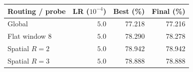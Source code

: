 \begin{tabular}{lrrr}
\toprule
Routing / probe & LR ($10^{-4}$) & Best (\%) & Final (\%) \\
\midrule
Global & $5.0$ & 77.218 & 77.216 \\
Flat window 8 & $5.0$ & 78.290 & 78.278 \\
Spatial $R=2$ & $5.0$ & 78.942 & 78.942 \\
Spatial $R=3$ & $5.0$ & 78.888 & 78.888 \\
\bottomrule
\end{tabular}
